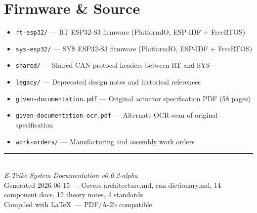 \documentclass[12pt,a4paper,oneside]{report}
\begin{document}
\section{Firmware \& Source}

\begin{itemize}[leftmargin=*,nosep]
  \item \texttt{rt-esp32/} --- RT ESP32-S3 firmware (PlatformIO, ESP-IDF + FreeRTOS)
  \item \texttt{sys-esp32/} --- SYS ESP32-S3 firmware (PlatformIO, ESP-IDF + FreeRTOS)
  \item \texttt{shared/} --- Shared CAN protocol headers between RT and SYS
  \item \texttt{legacy/} --- Deprecated design notes and historical references
  \item \texttt{given-documentation.pdf} --- Original actuator specification PDF (58 pages)
  \item \texttt{given-documentation-ocr.pdf} --- Alternate OCR scan of original specification
  \item \texttt{work-orders/} --- Manufacturing and assembly work orders
\end{itemize}

\vfill

\begin{center}
  \rule{0.5\textwidth}{0.4pt}\\[4mm]
  {\small\textit{E-Trike System Documentation v0.0.2-alpha}}\\[2mm]
  {\small Generated 2026-06-15 --- Covers architecture.md, can-dictionary.md, 14 component docs, 12 theory notes, 4 standards}\\[2mm]
  {\small Compiled with \LaTeX\ --- PDF/A-2b compatible}
\end{center}
\end{document}
